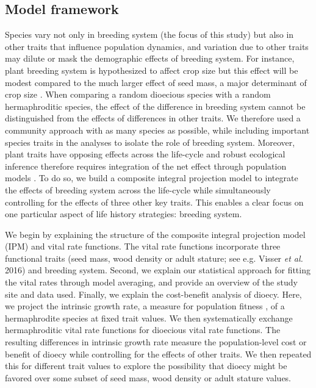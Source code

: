 \documentclass[b5paper,justified]{tufte-book} %
\begin{document}
\begin{fullwidth}
\subsection{Model framework}
Species vary not only in breeding system (the focus of this study) but also in other traits that influence population dynamics, and variation due to other traits may dilute or mask the demographic effects of breeding system. For instance, plant breeding system is hypothesized to affect crop size \citep{Queenborough2009} but this effect will be modest compared to the much larger effect of seed mass, a major determinant of crop size \citep{Moles2006,Muller-Landau2008}. When comparing a random dioecious species with a random hermaphroditic species, the effect of the difference in breeding system cannot be distinguished from the effects of differences in other traits. We therefore used a community approach with as many species as possible, while including important species traits in the analyses to isolate the role of breeding system. Moreover, plant traits have opposing effects across the life-cycle and robust ecological inference therefore requires integration of the net effect through population models \citep{Visser2016}. To do so, we build a composite integral projection model to integrate the effects of breeding system across the life-cycle while simultaneously controlling for the effects of three other key traits. This enables a clear focus on one particular aspect of life history strategies: breeding system.

We begin by explaining the structure of the composite integral projection model (IPM) and vital rate functions. The vital rate functions incorporate three functional traits (seed mass, wood density or adult stature; see e.g. Visser \textit{et al.} 2016) and breeding system. Second, we explain our statistical approach for fitting the vital rates through model averaging, and provide an overview of the study site and data used. Finally, we explain the cost-benefit analysis of dioecy.  Here, we project the intrinsic growth rate, a measure for population fitness \citep{Charlesworth1980, Caswell2001, Metcalf2007}, of a hermaphrodite species at fixed trait values. We then systematically exchange hermaphroditic vital rate functions for dioecious vital rate functions. The resulting differences in intrinsic growth rate measure the population-level cost or benefit of dioecy while controlling for the effects of other traits. We then repeated this for different trait values to explore the possibility that dioecy might be favored over some subset of seed mass, wood density or adult stature values.


\end{fullwidth}
\end{document}
